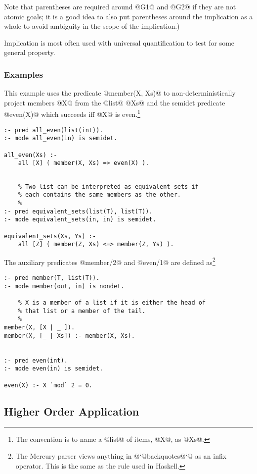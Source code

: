 \documentclass[a4paper,11pt,notitlepage,onecolumn]{article}
\begin{document}
Note that parentheses are required around @G1@ and @G2@ if they
are not atomic goals; it is a good idea to also put
parentheses around the implication as a whole to avoid
ambiguity in the scope of the implication.)

Implication is most often used with universal quantification
to test for some general property.

\subsubsection{Examples}

This example uses the predicate @member(X, Xs)@ to non-deterministically
project members @X@ from the @list@ @Xs@ and the semidet predicate
@even(X)@ which succeeds iff @X@ is even.\footnote{The convention is to
name a @list@ of items, @X@, as @Xs@.}
\begin{verbatim}
:- pred all_even(list(int)).
:- mode all_even(in) is semidet.

all_even(Xs) :-
    all [X] ( member(X, Xs) => even(X) ).

\end{verbatim}

\begin{verbatim}

    % Two list can be interpreted as equivalent sets if
    % each contains the same members as the other.
    %
:- pred equivalent_sets(list(T), list(T)).
:- mode equivalent_sets(in, in) is semidet.

equivalent_sets(Xs, Ys) :-
    all [Z] ( member(Z, Xs) <=> member(Z, Ys) ).
\end{verbatim}
The auxiliary predicates @member/2@ and @even/1@ are defined as\footnote{The Mercury parser views anything in @`@backquotes@`@
as an infix operator.  This is the same as the rule used in Haskell.}
\begin{verbatim}
:- pred member(T, list(T)).
:- mode member(out, in) is nondet.

    % X is a member of a list if it is either the head of
    % that list or a member of the tail.
    %
member(X, [X | _ ]).
member(X, [_ | Xs]) :- member(X, Xs).


:- pred even(int).
:- mode even(in) is semidet.

even(X) :- X `mod` 2 = 0.
\end{verbatim}

\subsection{Higher Order Application}
\end{document}
